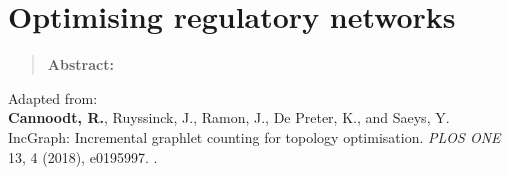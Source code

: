 \newpage{\thispagestyle{empty}\cleardoublepage}
\chapter{Optimising regulatory networks} 
\label{chap:incgraph}

\begin{quote}
	\textbf{Abstract:} \blindtext
\end{quote}

\vfill

Adapted from:\\
\textbf{Cannoodt, R.}, Ruyssinck, J., Ramon, J., De Preter, K., and Saeys, Y. IncGraph: Incremental graphlet counting for topology optimisation. \textit{PLOS ONE} 13, 4 (2018), e0195997. .
\newpage

\blindtext \cite{Eren2013}